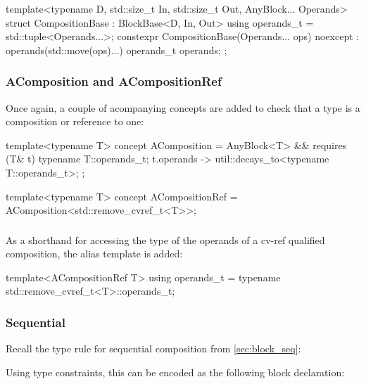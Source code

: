 \begin{cppcodenl}
  template<typename D, std::size_t In, std::size_t Out, AnyBlock... Operands>
  struct CompositionBase : BlockBase<D, In, Out> {
    using operands_t = std::tuple<Operands...>;
    constexpr CompositionBase(Operands... ops) noexcept : operands(std::move(ops)...) {}
    operands_t operands;
  };
\end{cppcodenl}

\subsubsection{AComposition and ACompositionRef}
Once again, a couple of acompanying concepts are added to check that a type  is a
composition or reference to one:

\begin{cppcodenl}
  template<typename T>
  concept AComposition = AnyBlock<T> && requires (T& t) {
    typename T::operands_t;
    { t.operands } -> util::decays_to<typename T::operands_t>;
  };

  template<typename T>
  concept ACompositionRef = AComposition<std::remove_cvref_t<T>>;
\end{cppcodenl}

\subsubsection{}

As a shorthand for accessing the type of the operands of a cv-ref qualified composition, the
 alias template is added:

\begin{cppcodenl}
  template<ACompositionRef T>
  using operands_t = typename std::remove_cvref_t<T>::operands_t;
\end{cppcodenl}

\subsubsection{Sequential}

Recall the type rule for sequential composition from \autoref{sec:block_seq}:

\begin{prooftree}
\end{prooftree}

Using type constraints, this can be encoded as the following block declaration:

